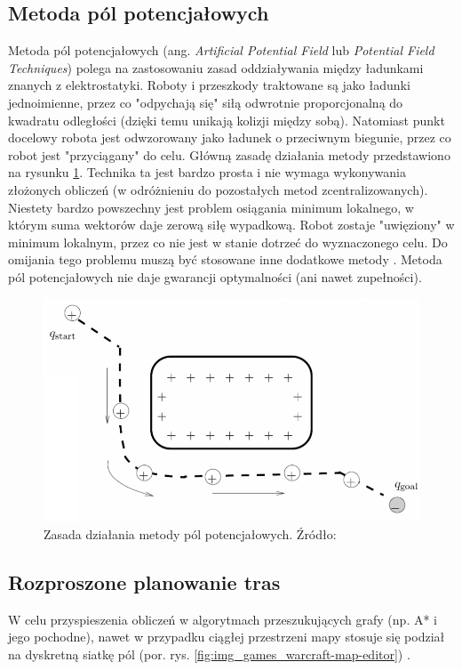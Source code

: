 \subsection{Metoda pól potencjałowych}
Metoda pól potencjałowych (ang. {\it Artificial Potential Field} lub {\it Potential Field Techniques}) polega na zastosowaniu zasad oddziaływania między ładunkami znanych z elektrostatyki. Roboty i przeszkody traktowane są jako ładunki jednoimienne, przez co "odpychają się" siłą odwrotnie proporcjonalną do kwadratu odległości (dzięki temu unikają kolizji między sobą). Natomiast punkt docelowy robota jest odwzorowany jako ładunek o przeciwnym biegunie, przez co robot jest "przyciągany" do celu.
Główną zasadę działania metody przedstawiono na rysunku \ref{fig:image_potentialfield}.
Technika ta jest bardzo prosta i nie wymaga wykonywania złożonych obliczeń (w odróżnieniu do pozostałych metod zcentralizowanych). Niestety bardzo powszechny jest problem osiągania minimum lokalnego, w którym suma wektorów daje zerową siłę wypadkową. Robot zostaje "uwięziony" w minimum lokalnym, przez co nie jest w stanie dotrzeć do wyznaczonego celu. Do omijania tego problemu muszą być stosowane inne dodatkowe metody \cite{potentialfield}.
Metoda pól potencjałowych nie daje gwarancji optymalności (ani nawet zupełności).
\begin{figure}
	\centering
	\includegraphics[width=12cm]{img/potential-field}
	\caption{Zasada działania metody pól potencjałowych. Źródło: \cite{howie_potentialfield}}
	\label{fig:image_potentialfield}
\end{figure}

\subsection{Rozproszone planowanie tras}
W celu przyspieszenia obliczeń w algorytmach przeszukujących grafy (np. A* i jego pochodne), nawet w przypadku ciągłej przestrzeni mapy stosuje się podział na dyskretną siatkę pól (por. rys. \ref{fig:img_games_warcraft-map-editor}) \cite{hierpathfindinginrts}.

